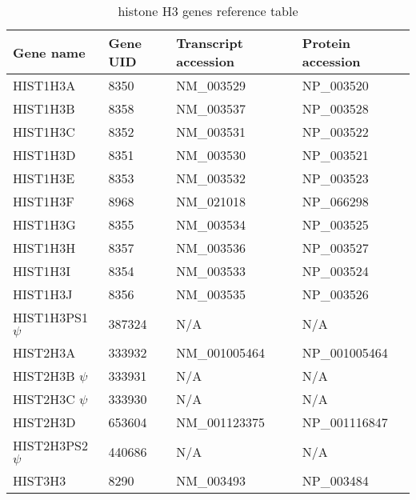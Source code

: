 \begin{table}
  \centering
  \begin{tabular}{l | l | l | l }
    Gene name & Gene UID & Transcript accession & Protein accession \\
    \hline
     HIST1H3A & 8350 & NM\_003529 & NP\_003520 \\
     HIST1H3B & 8358 & NM\_003537 & NP\_003528 \\
     HIST1H3C & 8352 & NM\_003531 & NP\_003522 \\
     HIST1H3D & 8351 & NM\_003530 & NP\_003521 \\
     HIST1H3E & 8353 & NM\_003532 & NP\_003523 \\
     HIST1H3F & 8968 & NM\_021018 & NP\_066298 \\
     HIST1H3G & 8355 & NM\_003534 & NP\_003525 \\
     HIST1H3H & 8357 & NM\_003536 & NP\_003527 \\
     HIST1H3I & 8354 & NM\_003533 & NP\_003524 \\
     HIST1H3J & 8356 & NM\_003535 & NP\_003526 \\
     HIST1H3PS1 $\psi$ & 387324 & N/A & N/A \\
     HIST2H3A & 333932 & NM\_001005464 & NP\_001005464 \\
     HIST2H3B $\psi$ & 333931 & N/A & N/A \\
     HIST2H3C $\psi$ & 333930 & N/A & N/A \\
     HIST2H3D & 653604 & NM\_001123375 & NP\_001116847 \\
     HIST2H3PS2 $\psi$ & 440686 & N/A & N/A \\
     HIST3H3 & 8290 & NM\_003493 & NP\_003484 \\
  \end{tabular}
  \caption{histone H3 genes reference table}
  \label{tab:h3-ref}
\end{table}
